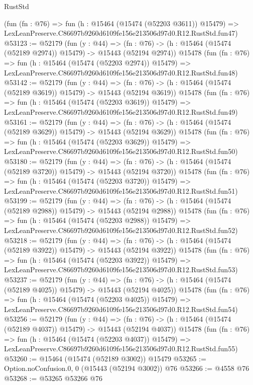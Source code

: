 \begin{lexlean}{RustStd}
\begin{coremodule}
    (fun (fn : @76) =>
    fun (h : @15464 (@15474 (@52203 @3611)) @15479) =>
    LexLeanPreserve.C86697b9260d6109fe156e213506d97d0.R12.RustStd.fun47)
@53123 := @52179
    (fun (y : @44) =>
    (fn : @76) -> (h : @15464 (@15474 (@52189 @2974)) @15479) -> @15443 (@52194 @2974))
    @15478
    (fun (fn : @76) =>
    fun (h : @15464 (@15474 (@52203 @2974)) @15479) =>
    LexLeanPreserve.C86697b9260d6109fe156e213506d97d0.R12.RustStd.fun48)
@53142 := @52179
    (fun (y : @44) =>
    (fn : @76) -> (h : @15464 (@15474 (@52189 @3619)) @15479) -> @15443 (@52194 @3619))
    @15478
    (fun (fn : @76) =>
    fun (h : @15464 (@15474 (@52203 @3619)) @15479) =>
    LexLeanPreserve.C86697b9260d6109fe156e213506d97d0.R12.RustStd.fun49)
@53161 := @52179
    (fun (y : @44) =>
    (fn : @76) -> (h : @15464 (@15474 (@52189 @3629)) @15479) -> @15443 (@52194 @3629))
    @15478
    (fun (fn : @76) =>
    fun (h : @15464 (@15474 (@52203 @3629)) @15479) =>
    LexLeanPreserve.C86697b9260d6109fe156e213506d97d0.R12.RustStd.fun50)
@53180 := @52179
    (fun (y : @44) =>
    (fn : @76) -> (h : @15464 (@15474 (@52189 @3720)) @15479) -> @15443 (@52194 @3720))
    @15478
    (fun (fn : @76) =>
    fun (h : @15464 (@15474 (@52203 @3720)) @15479) =>
    LexLeanPreserve.C86697b9260d6109fe156e213506d97d0.R12.RustStd.fun51)
@53199 := @52179
    (fun (y : @44) =>
    (fn : @76) -> (h : @15464 (@15474 (@52189 @2988)) @15479) -> @15443 (@52194 @2988))
    @15478
    (fun (fn : @76) =>
    fun (h : @15464 (@15474 (@52203 @2988)) @15479) =>
    LexLeanPreserve.C86697b9260d6109fe156e213506d97d0.R12.RustStd.fun52)
@53218 := @52179
    (fun (y : @44) =>
    (fn : @76) -> (h : @15464 (@15474 (@52189 @3922)) @15479) -> @15443 (@52194 @3922))
    @15478
    (fun (fn : @76) =>
    fun (h : @15464 (@15474 (@52203 @3922)) @15479) =>
    LexLeanPreserve.C86697b9260d6109fe156e213506d97d0.R12.RustStd.fun53)
@53237 := @52179
    (fun (y : @44) =>
    (fn : @76) -> (h : @15464 (@15474 (@52189 @4025)) @15479) -> @15443 (@52194 @4025))
    @15478
    (fun (fn : @76) =>
    fun (h : @15464 (@15474 (@52203 @4025)) @15479) =>
    LexLeanPreserve.C86697b9260d6109fe156e213506d97d0.R12.RustStd.fun54)
@53256 := @52179
    (fun (y : @44) =>
    (fn : @76) -> (h : @15464 (@15474 (@52189 @4037)) @15479) -> @15443 (@52194 @4037))
    @15478
    (fun (fn : @76) =>
    fun (h : @15464 (@15474 (@52203 @4037)) @15479) =>
    LexLeanPreserve.C86697b9260d6109fe156e213506d97d0.R12.RustStd.fun55)
@53260 := @15464 (@15474 (@52189 @3002)) @15479
@53265 := Option.noConfusion.{0, 0} (@15443 (@52194 @3002)) @76
@53266 := @4558 @76
@53268 := @53265 @53266 @76

\end{coremodule}
\end{lexlean}
